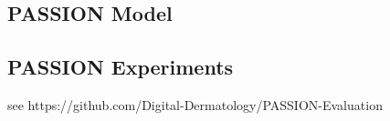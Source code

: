 \documentclass[12pt, a4paper, oneside]{book}   	%
\renewcommand{\todo}[1]{\textcolor{red}{TODO: #1}}
\newif\ifrawcitationactive
\newcommand{\rawcitationstart}{
	\color{purple}\rawcitationactivetrue
}
\newcommand{\rawcitationend}{
	\color{black}\rawcitationactivefalse
}
\begin{document}
			\subsection{PASSION Model}
			
			
			\subsection{PASSION Experiments}
				see https://github.com/Digital-Dermatology/PASSION-Evaluation
		
		

		
\end{document}
